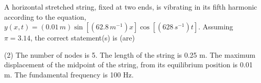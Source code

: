 
\item A horizontal stretched string, fixed at two ends, is vibrating in its fifth harmonic according to the equation, $y(x, t) = (0.01\, m) \sin [(62.8\, m^{-1}) x] \cos [(628\, s^{-1})t]$. Assuming $\pi = 3.14$, the correct statement(s) is (are)
        \begin{tasks}(2)
            \task The number of nodes is 5.
            \task The length of the string is 0.25 m.
            \task The maximum displacement of the midpoint of the string, from its equilibrium position is 0.01 m.
            \task The fundamental frequency is 100 Hz.
        \end{tasks}
